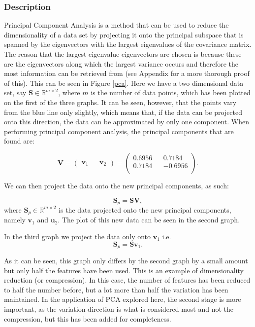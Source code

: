 \documentclass[11pt,a4paper]{article}
\begin{document}
\subsubsection{Description}
Principal Component Analysis is a method that can be used to reduce the dimensionality of a data set by projecting it onto the principal subspace that is spanned by the eigenvectors with the largest eigenvalues of the covariance matrix. The reason that the largest eigenvalue eigenvectors are chosen is because these are the eigenvectors along which the largest variance occurs and therefore the most information can be retrieved from (see Appendix for a more thorough proof of this). This can be seen in Figure \ref{pca}. Here we have a two dimensional data set, say $\mathbf{S} \in \mathbb{R}^{m \times 2}$, where $m$ is the number of data points, which has been plotted on the first of the three graphs. It can be seen, however, that the points vary from the blue line only slightly, which means that, if the data can be projected onto this direction, the data can be approximated by only one component. When performing principal component analysis, the principal components that are found are:

\begin{equation*}
\mathbf{V} = 
\begin{pmatrix}
\mathbf{v}_1 && \mathbf{v}_2
\end{pmatrix} = 
\begin{pmatrix}
0.6956 && 0.7184\\
 0.7184 && -0.6956\\
\end{pmatrix}.
\end{equation*}

We can then project the data onto the new principal components, as such:

\begin{equation*}
\mathbf{S}_p = \mathbf{S}\mathbf{V},
\end{equation*}
where $\mathbf{S}_p \in \mathbb{R}^{m \times 2}$ is the data projected onto the new principal components, namely $\mathbf{v}_1$ and $\mathbf{u}_2$. The plot of this new data can be seen in the second graph. 

In the third graph we project the data only onto $\mathbf{v}_1$ i.e.
\begin{equation*}
\mathbf{S}_p = \mathbf{S}\mathbf{v}_1.
\end{equation*}

As it can be seen, this graph only differs by the second graph by a small amount but only half the features have been used. This is an example of dimensionality reduction (or compression). In this case, the number of features has been reduced to half the number before, but a lot more than half the variation has been maintained. In the application of PCA explored here, the second stage is more important, as the variation direction is what is considered most and not the compression, but this has been added for completeness.
\end{document}
